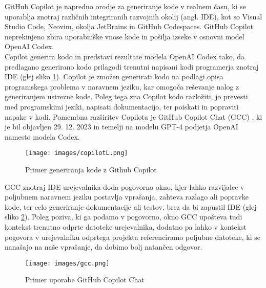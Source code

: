 \documentclass[a4paper,12pt,openright]{book}
\begin{document}
GitHub Copilot je napredno orodje za generiranje kode v realnem času, ki se uporablja znotraj različnih integriranih razvojnih okolij (angl. IDE), kot so Visual Studio Code, Neovim, okolja JetBrains in GitHub Codespaces. GitHub Copilot neprekinjeno zbira uporabniške vnose kode in pošilja izseke v osnovni model OpenAI Codex. \\
Copilot generira kodo in predstavi rezultate modela OpenAI Codex tako, da predlagano generirano kodo prilagodi trenutni napisani kodi programerja znotraj IDE (glej sliko \ref{fig:copilot}). Copilot je zmožen generirati kodo na podlagi opisa programskega problema v naravnem jeziku, kar omogoča reševanje nalog z generiranjem ustrezne kode. Poleg tega zna Copilot kodo razložiti, jo prevesti med programskimi jeziki, napisati dokumentacijo, ter poiskati in popraviti napake v kodi.
Pomembna razširitev Copilota je GitHub Copilot Chat (GCC) , ki je bil objavljen 29. 12. 2023 in temelji na modelu GPT-4 podjetja OpenAI namesto modela Codex. 
\cite{Sundqvist1866649} \\
\begin{figure}[H]
    \centering
    \texttt{[image: images/copilotL.png]}
    \caption{Primer generiranja kode z Github Copilot}
    \label{fig:copilot}
\end{figure}

GCC znotraj IDE urejevalnika doda pogovorno okno, kjer lahko razvijalec v poljubnem naravnem jeziku postavlja vprašanja, zahteva razlago ali popravke kode, ter celo generiranje dokumentacije ali testov, brez da bi zapustil IDE (glej sliko \ref{fig:gcc}). Poleg poziva, ki ga podamo v pogovorno, okno GCC upošteva tudi kontekst trenutno odprte datoteke urejevalnika, dodatno pa lahko v kontekst pogovora v urejevalniku odprtega projekta referenciramo poljubne datoteke, ki se nanašajo na naše vprašanje, da dobimo bolj natančen odgovor.\cite{github_copilot_chat} \\
\begin{figure}[H]
    \centering
    \texttt{[image: images/gcc.png]}
    \caption{Primer uporabe GitHub Copilot Chat}
    \label{fig:gcc}
\end{figure}
\end{document}
